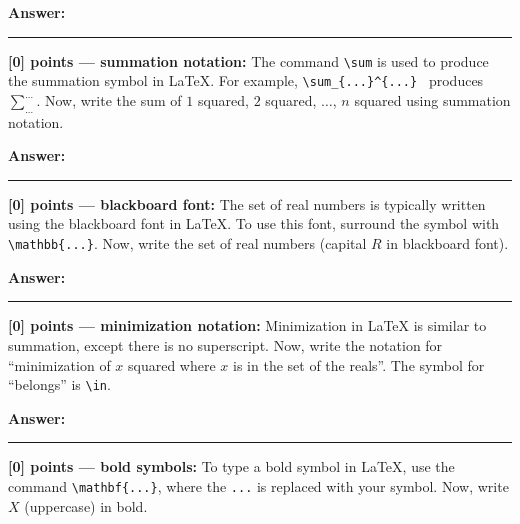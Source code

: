 \documentclass{article}
\newcommand{\mydivider}{\vspace{1em}\hrule\vspace{1em}}
\begin{document}
\begin{tcolorbox}
\textbf{Answer: }


\end{tcolorbox}


\mydivider

\noindent\textbf{[0] points --- summation notation:} The command \verb|\sum| is used to produce the summation symbol in LaTeX. For example, \verb|\sum_{...}^{...} | produces $\sum_{...}^{...}$. Now, write the sum of $1$ squared, $2$ squared, $\ldots$, $n$ squared using summation notation.

\begin{tcolorbox}
\textbf{Answer: }


\end{tcolorbox}

\mydivider


\noindent\textbf{[0] points --- blackboard font:} The set of real numbers is typically written using the blackboard font in LaTeX. To use this font, surround the symbol with \verb|\mathbb{...}|. Now, write the set of real numbers (capital $R$ in blackboard font).

\begin{tcolorbox}
\textbf{Answer: }


\end{tcolorbox}

\mydivider

\noindent\textbf{[0] points --- minimization notation:} Minimization in LaTeX is similar to summation, except there is no superscript. Now, write the notation for ``minimization of $x$ squared where $x$ is in the set of the reals''. The symbol for ``belongs'' is \verb|\in|.

\begin{tcolorbox}
\textbf{Answer: }


\end{tcolorbox}

\mydivider

\noindent\textbf{[0] points --- bold symbols:} To type a bold symbol in LaTeX, use the command \verb|\mathbf{...}|, where the \verb|...| is replaced with your symbol.  Now, write $X$  (uppercase) in bold.
\end{document}
